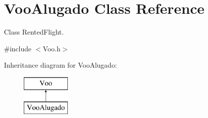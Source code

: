 \hypertarget{class_voo_alugado}{}\section{Voo\+Alugado Class Reference}
\label{class_voo_alugado}


Class Rented\+Flight.  




{\ttfamily \#include $<$Voo.\+h$>$}

Inheritance diagram for Voo\+Alugado\+:\begin{figure}[H]
\begin{center}
\leavevmode
\includegraphics[height=2.000000cm]{class_voo_alugado}
\end{center}
\end{figure}
